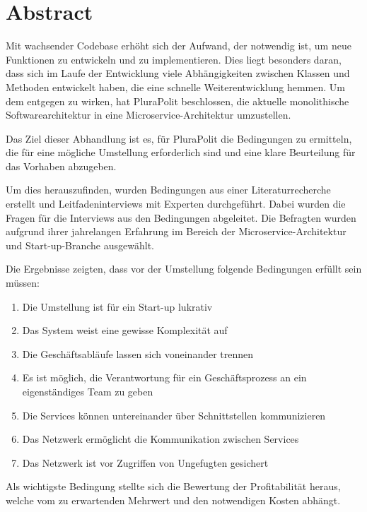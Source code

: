 \section*{Abstract}

Mit wachsender Codebase erhöht sich der Aufwand, der notwendig ist, um neue Funktionen zu entwickeln und zu implementieren. Dies liegt besonders daran, dass sich im Laufe der Entwicklung viele Abhängigkeiten zwischen Klassen und Methoden entwickelt haben, die eine schnelle Weiterentwicklung hemmen. Um dem entgegen zu wirken, hat PluraPolit beschlossen, die aktuelle monolithische Softwarearchitektur in eine Microservice-Architektur umzustellen.


Das Ziel dieser Abhandlung ist es, für PluraPolit die Bedingungen zu ermitteln, die für eine mögliche Umstellung erforderlich sind und eine klare Beurteilung für das Vorhaben abzugeben.

Um dies herauszufinden, wurden Bedingungen aus einer Literaturrecherche erstellt und Leitfadeninterviews mit Experten durchgeführt. Dabei wurden die Fragen für die Interviews aus den Bedingungen abgeleitet. Die Befragten wurden aufgrund ihrer jahrelangen Erfahrung im Bereich der Microservice-Architektur und Start-up-Branche ausgewählt.

Die Ergebnisse zeigten, dass vor der Umstellung folgende Bedingungen erfüllt sein müssen:
\begin{enumerate}
	\item Die Umstellung ist für ein Start-up lukrativ
	\item Das System weist eine gewisse Komplexität auf
	\item Die Geschäftsabläufe lassen sich voneinander trennen
	\item Es ist möglich, die Verantwortung für ein Geschäftsprozess an ein eigenständiges Team zu geben
	\item Die Services können untereinander über Schnittstellen kommunizieren
	\item Das Netzwerk ermöglicht die Kommunikation zwischen Services
	\item Das Netzwerk ist vor Zugriffen von Ungefugten gesichert
\end{enumerate}

Als wichtigste Bedingung stellte sich die Bewertung der Profitabilität heraus, welche vom zu erwartenden Mehrwert und den notwendigen Kosten abhängt.

